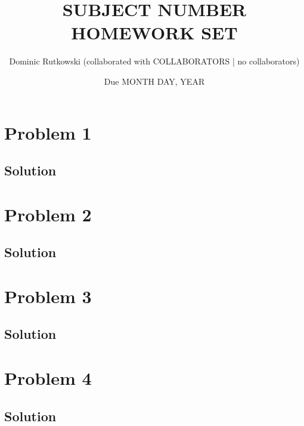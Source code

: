 \documentclass{article}
\title{SUBJECT NUMBER HOMEWORK SET}
\author{Dominic Rutkowski (collaborated with COLLABORATORS | no collaborators)}
\date{Due MONTH DAY, YEAR}
\begin{document}
\begin{titlepage}
    \null
    \nointerlineskip
    \vfill
    \let \snewpage \newpage
    \let \newpage \relax
    \maketitle
    \let \newpage \snewpage
    \vfill
    \null\null\null\null\null\null\null
    \thispagestyle{empty}
\end{titlepage}
\setcounter{page}{2}

\section{Problem 1}
\subsection*{Solution}
\newpage


\section{Problem 2}
\subsection*{Solution}
\newpage


\section{Problem 3}
\subsection*{Solution}
\newpage


\section{Problem 4}
\subsection*{Solution}
\end{document}
